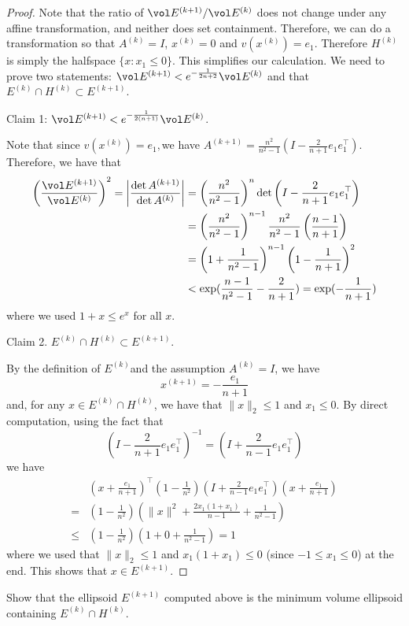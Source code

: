 \begin{proof}
Note that the ratio of $\vol E^{(k+1)}/\vol E^{(k)}$ does not change
under any affine transformation, and neither does set containment.
Therefore, we can do a transformation so that $A^{(k)}=I$, $x^{(k)}=0$
and $v(x^{(k)})=e_{1}$. Therefore $H^{(k)}$ is simply the halfspace
$\{x:x_{1}\le0\}$. This simplifies our calculation. We need to prove
two statements: $\vol E^{(k+1)}<e^{-\frac{1}{2n+2}}\vol E^{(k)}$
and that $E^{(k)}\cap H^{(k)}\subset E^{(k+1)}$.

Claim 1: $\vol E^{(k+1)}<e^{-\frac{1}{2(n+1)}}\vol E^{(k)}$.

Note that since $v(x^{(k)})=e_{1},$we have $A^{(k+1)}=\frac{n^{2}}{n^{2}-1}\left(I-\frac{2}{n+1}e_{1}e_{1}^{\top}\right)$.
Therefore, we have that
\begin{align*}
\left(\frac{\vol E^{(k+1)}}{\vol E^{(k)}}\right)^{2}=\left|\frac{\det A^{(k+1)}}{\det A^{(k)}}\right| & =\left(\frac{n^{2}}{n^{2}-1}\right)^{n}\det\left(I-\frac{2}{n+1}e_{1}e_{1}^{\top}\right)\\
 & =\left(\frac{n^{2}}{n^{2}-1}\right)^{n-1}\frac{n^{2}}{n^{2}-1}\left(\frac{n-1}{n+1}\right)\\
 & =\left(1+\frac{1}{n^{2}-1}\right)^{n-1}\left(1-\frac{1}{n+1}\right)^{2}\\
 & <\exp(\frac{n-1}{n^{2}-1}-\frac{2}{n+1})=\exp(-\frac{1}{n+1})
\end{align*}
where we used $1+x\leq e^{x}$ for all $x$.

Claim 2. $E^{(k)}\cap H^{(k)}\subset E^{(k+1)}$.

By the definition of $E^{(k)}$and the assumption $A^{(k)}=I$, we
have 
\[
x^{(k+1)}=-\frac{e_{1}}{n+1}
\]
and, for any $x\in E^{(k)}\cap H^{(k)}$, we have that $\|x\|_{2}\leq1$
and $x_{1}\leq0$. By direct computation, using the fact that 
\[
\left(I-\frac{2}{n+1}e_{1}e_{1}^{\top}\right)^{-1}=\left(I+\frac{2}{n-1}e_{1}e_{1}^{\top}\right)
\]
we have
\begin{align*}
 & (x+\frac{e_{1}}{n+1})^{\top}\left(1-\frac{1}{n^{2}}\right)\left(I+\frac{2}{n-1}e_{1}e_{1}^{\top}\right)(x+\frac{e_{1}}{n+1})\\
= & \left(1-\frac{1}{n^{2}}\right)\left(\|x\|^{2}+\frac{2x_{1}(1+x_{1})}{n-1}+\frac{1}{n^{2}-1}\right)\\
\leq & \left(1-\frac{1}{n^{2}}\right)\left(1+0+\frac{1}{n^{2}-1}\right)=1
\end{align*}
where we used that $\|x\|_{2}\leq1$ and $x_{1}(1+x_{1})\leq0$ (since
$-1\leq x_{1}\leq0$) at the end. This shows that $x\in E^{(k+1)}$.
\end{proof}
\begin{xca}
Show that the ellipsoid $E^{(k+1)}$ computed above is the minimum
volume ellipsoid containing $E^{(k)}\cap H^{(k)}$.
\end{xca}

